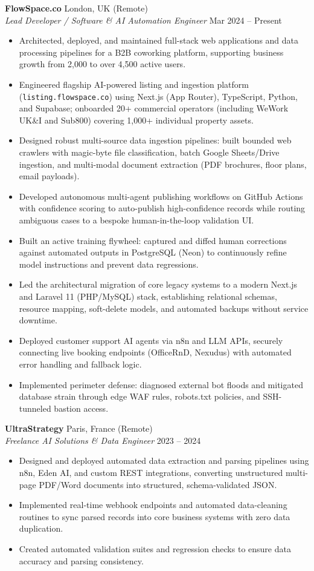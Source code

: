 \documentclass[10pt,a4paper]{article}
\begin{document}
\textbf{FlowSpace.co} \hfill London, UK (Remote)\\
\textit{Lead Developer / Software \& AI Automation Engineer} \hfill Mar 2024 -- Present
\begin{itemize}
    \item Architected, deployed, and maintained full-stack web applications and data processing pipelines for a B2B coworking platform, supporting business growth from 2,000 to over 4,500 active users.
    \item Engineered flagship AI-powered listing and ingestion platform (\texttt{listing.flowspace.co}) using Next.js (App Router), TypeScript, Python, and Supabase; onboarded 20+ commercial operators (including WeWork UK\&I and Sub800) covering 1,000+ individual property assets.
    \item Designed robust multi-source data ingestion pipelines: built bounded web crawlers with magic-byte file classification, batch Google Sheets/Drive ingestion, and multi-modal document extraction (PDF brochures, floor plans, email payloads).
    \item Developed autonomous multi-agent publishing workflows on GitHub Actions with confidence scoring to auto-publish high-confidence records while routing ambiguous cases to a bespoke human-in-the-loop validation UI.
    \item Built an active training flywheel: captured and diffed human corrections against automated outputs in PostgreSQL (Neon) to continuously refine model instructions and prevent data regressions.
    \item Led the architectural migration of core legacy systems to a modern Next.js and Laravel 11 (PHP/MySQL) stack, establishing relational schemas, resource mapping, soft-delete models, and automated backups without service downtime.
    \item Deployed customer support AI agents via n8n and LLM APIs, securely connecting live booking endpoints (OfficeRnD, Nexudus) with automated error handling and fallback logic.
    \item Implemented perimeter defense: diagnosed external bot floods and mitigated database strain through edge WAF rules, robots.txt policies, and SSH-tunneled bastion access.
\end{itemize}

\vspace{2pt}
\textbf{UltraStrategy} \hfill Paris, France (Remote)\\
\textit{Freelance AI Solutions \& Data Engineer} \hfill 2023 -- 2024
\begin{itemize}
    \item Designed and deployed automated data extraction and parsing pipelines using n8n, Eden AI, and custom REST integrations, converting unstructured multi-page PDF/Word documents into structured, schema-validated JSON.
    \item Implemented real-time webhook endpoints and automated data-cleaning routines to sync parsed records into core business systems with zero data duplication.
    \item Created automated validation suites and regression checks to ensure data accuracy and parsing consistency.
\end{itemize}
\end{document}
